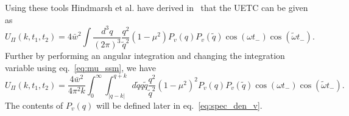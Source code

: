 Using these tools Hindmarsh et al. have derived in~\cite{hindmarsh_gw_pt_2019} that the UETC can be given as
\cite[eq. 3.32]{hindmarsh_gw_pt_2019}
\begin{equation}
U_\Pi(k, t_1, t_2) = 4 \bar{w}^2 \int \frac{d^3 q}{(2\pi)^3} \frac{q^2}{\tilde{q}^2} (1 - \mu^2) P_v(q) P_v(\tilde{q}) \cos (\omega t_-) \cos (\tilde{\omega} t_-).
\end{equation}
Further by performing an angular integration and changing the integration variable using eq.~\eqref{eq:mu_ssm}, we have
\cite[eq. 3.34]{hindmarsh_gw_pt_2019}
\begin{equation}
U_\Pi (k, t_1, t_2) = \frac{4 \bar{w}^2}{4 \pi^2 k} \int_0^\infty \int_{|q-k|}^{q+k} d\tilde{q} q \tilde{q}
\frac{q^2}{\tilde{q}^2} (1-\mu^2)^2
P_v(q) P_v(\tilde{q})
\cos (\omega t_-) \cos (\tilde{\omega} t_-).
\label{eq:uetc_final}
\end{equation}
The contents of $P_v(q)$ will be defined later in eq.~\eqref{eq:spec_den_v}.



